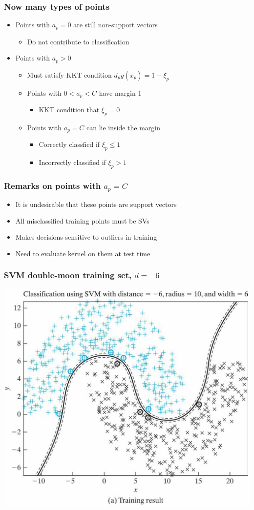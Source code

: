 \documentclass[12pt,notes,mathserif]{beamer}
\begin{document}
\begin{frame}[c]
\frametitle{Now many types of points}
\begin{itemize}
\item Points with $a_p= 0$ are still non-support vectors
\begin{itemize}
\item Do not contribute to classification
\end{itemize}
\item Points with $a_p>0$
\begin{itemize}
\item Must satisfy KKT condition $d_py(x_p)=1-\xi_p$
\item Points with $0 < a_p < C$ have margin 1
\begin{itemize}
\item KKT condition that $\xi_p=0$
\end{itemize}
\item Points with $a_p=C$ can lie inside the margin
\begin{itemize}
\item Correctly classfied if $\xi_p\leqslant{}1$
\item Incorrectly classified if $\xi_p>1$
\end{itemize}
\end{itemize}
\end{itemize}
\end{frame}


\begin{frame}[c]
\frametitle{Remarks on points with $a_p=C$}
\begin{itemize}
\item It is undesirable that these points are support vectors
\item All misclassified training points must be SVs
\item Makes decisions sensitive to outliers in training
\item Need to evaluate kernel on them at test time
\end{itemize}
\end{frame}



\begin{frame}[c]
\frametitle{SVM double-moon training set, $d=-6$}
\begin{center}
\includegraphics[width=0.7\linewidth]{fig10/lec1110.jpg}
\end{center}
\end{frame}
\end{document}
